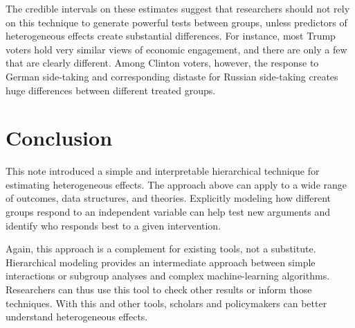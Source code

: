 \documentclass[12pt]{article}
\begin{document}
The credible intervals on these estimates suggest that researchers should not rely on this technique to generate powerful tests between groups, unless predictors of heterogeneous effects create substantial differences. 
For instance, most Trump voters hold very similar views of economic engagement, and there are only a few that are clearly different. 
Among Clinton voters, however, the response to German side-taking and corresponding distaste for Russian side-taking creates huge differences between different treated groups. 


\section{Conclusion}

This note introduced a simple and interpretable hierarchical technique for estimating heterogeneous effects. 
The approach above can apply to a wide range of outcomes, data structures, and theories. 
Explicitly modeling how different groups respond to an independent variable can help test new arguments and identify who responds best to a given intervention. 


Again, this approach is a complement for existing tools, not a substitute. 
Hierarchical modeling provides an intermediate approach between simple interactions or subgroup analyses and complex machine-learning algorithms. 
Researchers can thus use this tool to check other results or inform those techniques.
With this and other tools, scholars and policymakers can better understand heterogeneous effects.


\singlespace
 
 
\end{document}
